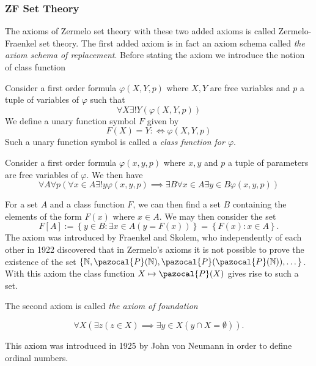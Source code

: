 \subsubsection{ZF Set Theory}
The axioms of Zermelo set theory with these two added axioms is called Zermelo-Fraenkel set theory. The first added axiom is in fact an axiom schema called \textit{the axiom schema of replacement}. Before stating the axiom we introduce the notion of class function
\begin{definition}
    Consider a first order formula $\varphi(X,Y,p)$ where $X,Y$ are free variables and $p$ a tuple of variables of $\varphi$ such that 
    $$\forall X\exists! Y(\varphi(X,Y,p))$$
    We define a unary function symbol $F$ given by 
    $$F(X)=Y :\iff \varphi(X,Y,p)$$
    Such a unary function symbol is called a \textit{class function for $\varphi$}.
\end{definition}
\begin{axioms}
   Consider a first order formula $\varphi(x,y,p)$ where $x,y$ and $p$ a tuple of parameters are free variables of $\varphi$. We then have 
      $$\forall A\forall p(\forall x\in A\exists! y\varphi(x,y,p)\implies \exists B\forall x\in A\exists y\in B\varphi(x,y,p))$$
\end{axioms} 
\begin{remark}
    For a set $A$ and a class function $F$, we can then find a set $B$ containing the elements of the form $F(x)$ where $x\in A$. We may then consider the set 
    $$F[A] := \left\{ y\in B: \exists x\in A(y=F(x))\right\}=\left\{F(x) : x\in A\right\}.$$
    The axiom was introduced by Fraenkel and Skolem, who independently of each other in 1922 discovered that in Zermelo's axioms it is not possible to prove the existence of the set $\{\N,\pazocal{P}(\N),\pazocal{P}(\pazocal{P}(\N)),\dots\}$. With this axiom the class function $X\mapsto \pazocal{P}(X)$ gives rise to such a set. 
\end{remark}
The second axiom is called \textit{the axiom of foundation}
\begin{axioms}
    $$\forall X\left(\exists z(z\in X)\implies \exists y\in X(y\cap X = \emptyset)\right).$$
\end{axioms}
This axiom was introduced in 1925 by John von Neumann in order to define ordinal numbers.
